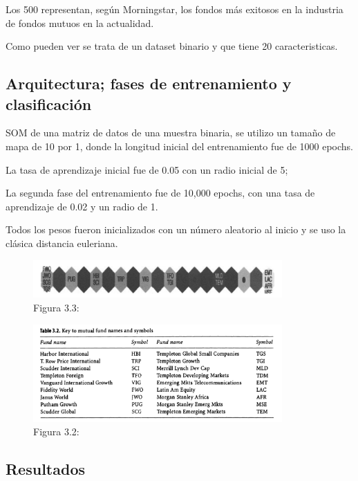 \documentclass[fleqn, journal, onecolumn]{IEEEtran}             %
\theoremstyle{break}                                            %
\begin{document}
        Los 500 representan, según Morningstar, los fondos más exitosos en la industria de fondos 
        mutuos en la actualidad.

        Como pueden ver se trata de un dataset binario y que tiene 20 caracteristicas.


      \subsection{Arquitectura; fases de entrenamiento y clasificación}

        SOM de una matriz de datos de una muestra binaria, 
        se utilizo un tamaño de mapa de 10 por 1, donde la longitud inicial del
        entrenamiento fue de 1000 epochs.
        
        La tasa de aprendizaje inicial fue de 0.05 con un radio inicial de 5;
        
        La segunda fase del entrenamiento fue de 10,000 epochs, con una tasa de aprendizaje de 0.02
        y un radio de 1.

        Todos los pesos fueron inicializados con un número aleatorio al inicio y se uso la clásica distancia
        euleriana.

        \begin{figure}[h]
            \centering
            \includegraphics[width=0.85\textwidth]{Table1}
            \caption{Figura 3.3: \cite{Visual}}
        \end{figure}

        \begin{figure}[h]
            \centering
            \includegraphics[width=0.85\textwidth]{Table2}
            \caption{Figura 3.2: \cite{Visual}}
        \end{figure}
        
      \subsection{Resultados}
\end{document}

